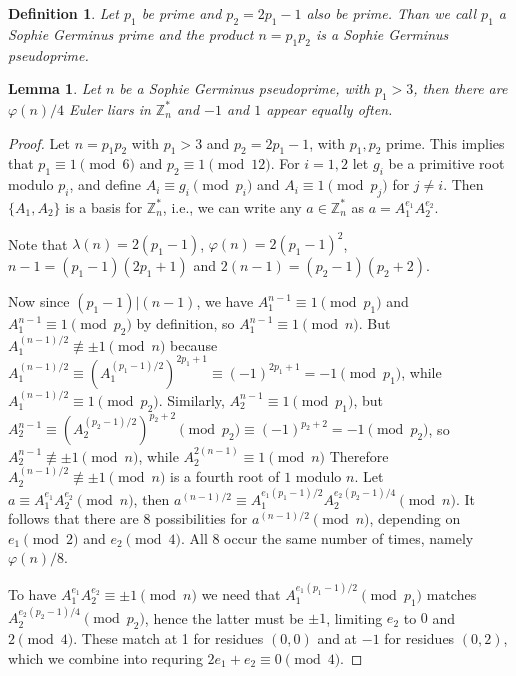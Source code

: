 \documentclass[runningheads]{amsart}
\newtheorem{lemma}[theorem]{Lemma}
\newtheorem{definition}{Definition}
\newcommand{\Z}{\mathbb{Z}}
\begin{document}
\begin{definition}
Let
$p_1$
be prime and
$p_2
= 2
p_1
- 1$ also be prime.
Than we call
$p_1$
a Sophie Germinus prime and the product $n =
p_1p_2$
is a Sophie Germinus pseudoprime.
\end{definition}

\begin{lemma} \label{lem:germinus}
Let $n$ be a Sophie Germinus pseudoprime,
with
$p_1
>3$,
then there are
$\varphi(n)/4$
Euler liars in
$\mathbb{Z}_n^*$
and $-1$ and $1$ appear equally often.
\end{lemma}

\begin{proof}
Let $n =
p_1p_2$
with
$p_1
>
3$ and
$p_2
=
2p_1
- 1$,
with
$p_1,
p_2$
prime.
This implies that $
p_1
\equiv
1
\pmod{6}
$ and $
p_2
\equiv
1
\pmod{12}$.
For $ i = 1,
2 $ let $
g_i
$ be a primitive root modulo $
p_i
$,
and define $
A_i
\equiv
g_i
\pmod{p_i}
$ and $
A_i
\equiv
1
\pmod{p_j}
$ for $ j
\neq
i $.
Then $
\{
A_1,
A_2
\}
$ is a basis for $
\Z_n^*
$,
i.e.,
we can write any $a
\in
\mathbb{Z}_n^*$
as $a =
A_1^{e_1}A_2^{e_2}$.

Note that
$\lambda(n)
=
2(p_1
-1)$,
$\varphi(n)
= 2
(p_1
-
1)^2$,
$n -1 =
(p_1
- 1)(2
p_1
+ 1)$ and $2(n-1) =
(p_2
-
1)(p_2
+ 2)$.

Now since
$(p_1
-1)
|
(n-1)$,
we have $
A_1^{n-1}
\equiv
1
\pmod{p_1}$
and $
A_1^{n-1}
\equiv
1
\pmod{p_2}
$ by definition,
so $
A_1^{n-1}
\equiv
1
\pmod{n}
$.
But $
A_1^{(n-1)/2}
\not\equiv
\pm
1
\pmod{n}
$ because $
A_1^{(n-1)/2}
\equiv
\left(A_1^{(p_1-1)/2}\right)^{2p_1+1}
\equiv
(-1)^{2p_1+1}
= -1
\pmod{p_1}
$,
while $
A_1^{(n-1)/2}
\equiv
1
\pmod{p_2}
$.
Similarly,
$
A_2^{n-1}
\equiv
1
\pmod{p_1}
$,
but $
A_2^{n-1}
\equiv
\left(A_2^{(p_2-1)/2}\right)^{p_2+2}
\pmod{p_2}
\equiv
(-1)^{p_2+2}
= -1
\pmod{p_2}
$,
so $
A_2^{n-1}
\not\equiv
\pm
1
\pmod{n}$,
while $
A_2^{2(n-1)}
\equiv
1
\pmod{n}$
Therefore $
A_2^{(n-1)/2}
\not\equiv
\pm
1
\pmod{n}
$ is a fourth root of $ 1 $ modulo $ n $.
Let $a
\equiv
A_1^{e_1}A_2^{e_2}
\pmod{n}$,
then
$a^{(n-1)/2}
\equiv
A_1^{e_1(p_1-1)/2}A_2^{e_2(p_2-1)/4}
\pmod{n}$.
It follows that there are $ 8 $ possibilities for $
a^{(n-1)/2}
\pmod{n}
$,
depending on
$e_1
\pmod2$
and
$e_2\pmod4$.
All $ 8 $ occur the same number of times,
namely $
\varphi(n)/8
$.

To have $
A_1^{e_1}A_2^{e_2}\equiv
\pm
1
\pmod{n}$
we need that
$A_1^{e_1(p_1-1)/2}
\pmod{p_1}$
matches
$A_2^{e_2(p_2-1)/4}
\pmod{p_2}$,
hence the latter must be
$\pm
1$,
limiting
$e_2$
to $0$ and
$2\pmod4$.
These match at 1 for residues $(0,0)$ and at $-1$ for residues $(0,2)$,
which we combine into requring $2
e_1
+
e_2
\equiv
0
\pmod{4}$.


\end{proof}
\end{document}
